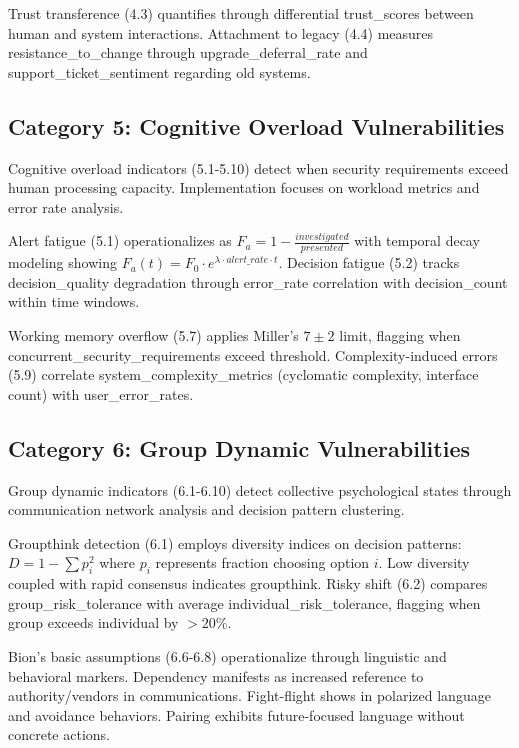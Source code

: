 \documentclass[10pt, twocolumn]{article}
\begin{document}
Trust transference (4.3) quantifies through differential trust\_scores between human and system interactions. Attachment to legacy (4.4) measures resistance\_to\_change through upgrade\_deferral\_rate and support\_ticket\_sentiment regarding old systems.

\subsection{Category 5: Cognitive Overload Vulnerabilities}

Cognitive overload indicators (5.1-5.10) detect when security requirements exceed human processing capacity. Implementation focuses on workload metrics and error rate analysis.

Alert fatigue (5.1) operationalizes as $F_a = 1 - \frac{investigated}{presented}$ with temporal decay modeling showing $F_a(t) = F_0 \cdot e^{\lambda \cdot alert\_rate \cdot t}$. Decision fatigue (5.2) tracks decision\_quality degradation through error\_rate correlation with decision\_count within time windows.

Working memory overflow (5.7) applies Miller's $7\pm2$ limit, flagging when concurrent\_security\_requirements exceed threshold. Complexity-induced errors (5.9) correlate system\_complexity\_metrics (cyclomatic complexity, interface count) with user\_error\_rates.

\subsection{Category 6: Group Dynamic Vulnerabilities}

Group dynamic indicators (6.1-6.10) detect collective psychological states through communication network analysis and decision pattern clustering.

Groupthink detection (6.1) employs diversity indices on decision patterns: $D = 1 - \sum p_i^2$ where $p_i$ represents fraction choosing option $i$. Low diversity coupled with rapid consensus indicates groupthink. Risky shift (6.2) compares group\_risk\_tolerance with average individual\_risk\_tolerance, flagging when group exceeds individual by $>20\%$.

Bion's basic assumptions (6.6-6.8) operationalize through linguistic and behavioral markers. Dependency manifests as increased reference to authority/vendors in communications. Fight-flight shows in polarized language and avoidance behaviors. Pairing exhibits future-focused language without concrete actions.
\end{document}
